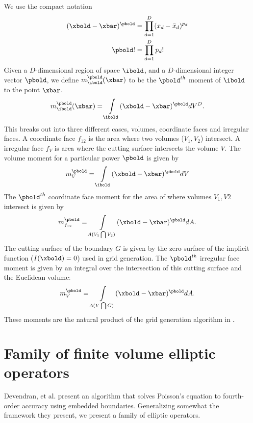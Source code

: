 \documentclass{article}
\begin{document}
We use the compact notation
\begin{align*}
(\xbold - \xbar)^\pbold &= \prod\limits^D_{d=1} (x_d - {\bar x}_d)^{p_d} \\
\pbold! &= \prod\limits^D_{d = 1} p_d!
\end{align*}
Given a $D$-dimensional region of space $\ibold$, 
and a $D$-dimensional integer vector
$\pbold$, we define $m_\ibold^\pbold(\xbar)$ to be the $\pbold^{th}$
moment of $\ibold$ to the point $\xbar$.
\begin{equation}
m_\ibold^\pbold(\xbar)  =  \int\limits_{\ibold} (\xbold - \xbar)^\pbold dV^D.
\label{eqn::volmoment}
\end{equation}
This breaks out into three different cases, volumes, coordinate faces
and irregular faces.
A coordinate face $f_{12}$  is the area where two
volumes ($V_1, V_2$) intersect.
A irregular face $f_V$  is area where the cutting surface
intersects the volume $V$.
The volume moment for a particular power $\pbold$  is
given by
\begin{equation}
  m^\pbold_V = \int\limits_{\ibold} (\xbold - \xbar)^\pbold dV
  \label{eqn::volmom}
\end{equation}
The $\pbold^{th}$ coordinate face moment for the area of where volumes $V_1, V2$
intersect is given by
\begin{equation}
  m^\pbold_{f_{12}} = \int\limits_{A(V_1\bigcap V_2)} (\xbold - \xbar)^\pbold dA.
  \label{eqn::facmom}
\end{equation}
The cutting surface of the boundary $G$ is given by  the zero
surface of the  implicit function ($I(\xbold)= 0$) used in grid generation.
The $\pbold^{th}$ irregular face moment is given by an integral over
the intersection of this cutting surface and the Euclidean volume:
\begin{equation}
  m^\pbold_V = \int\limits_{A(V \bigcap G)} (\xbold - \xbar)^\pbold dA.
  \label{eqn::irrmom}
\end{equation}
These moments are the natural product of the grid generation algorithm
in \cite{Schwartz2015}.


\section{Family of finite volume elliptic operators}

Devendran, et al. \cite{Devendran2017} present an algorithm that
solves Poisson's equation to fourth-order accuracy using embedded
boundaries.  Generalizing somewhat  the framework they present, we
present a family of elliptic operators.
\end{document}

